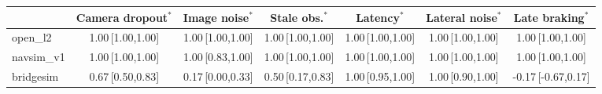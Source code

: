 \begin{tabular}{@{}lcccccc@{}}
\toprule
 & Camera dropout$^{\ast}$ & Image noise$^{\ast}$ & Stale obs.$^{\ast}$ & Latency$^{\ast}$ & Lateral noise$^{\ast}$ & Late braking$^{\ast}$ \\
\midrule
open\_l2 & 1.00\,{\scriptsize[1.00,1.00]} & 1.00\,{\scriptsize[1.00,1.00]} & 1.00\,{\scriptsize[1.00,1.00]} & 1.00\,{\scriptsize[1.00,1.00]} & 1.00\,{\scriptsize[1.00,1.00]} & 1.00\,{\scriptsize[1.00,1.00]} \\
navsim\_v1 & 1.00\,{\scriptsize[1.00,1.00]} & 1.00\,{\scriptsize[0.83,1.00]} & 1.00\,{\scriptsize[1.00,1.00]} & 1.00\,{\scriptsize[1.00,1.00]} & 1.00\,{\scriptsize[1.00,1.00]} & 1.00\,{\scriptsize[1.00,1.00]} \\
bridgesim & 0.67\,{\scriptsize[0.50,0.83]} & 0.17\,{\scriptsize[0.00,0.33]} & 0.50\,{\scriptsize[0.17,0.83]} & 1.00\,{\scriptsize[0.95,1.00]} & 1.00\,{\scriptsize[0.90,1.00]} & -0.17\,{\scriptsize[-0.67,0.17]} \\
\bottomrule
\end{tabular}
